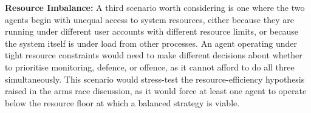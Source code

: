 \textbf{Resource Imbalance:} A third scenario worth considering is one where the two agents begin with unequal access to system resources, either because they are running under different user accounts with different resource limits, or because the system itself is under load from other processes. An agent operating under tight resource constraints would need to make different decisions about whether to prioritise monitoring, defence, or offence, as it cannot afford to do all three simultaneously. This scenario would stress-test the resource-efficiency hypothesis raised in the arms race discussion, as it would force at least one agent to operate below the resource floor at which a balanced strategy is viable.